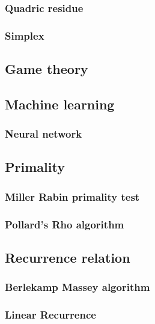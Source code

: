 \documentclass[titlepage,a4paper,10pt]{article}
\begin{document}
\begin{multicols}{2}
\begin{spacing}{0.8}
{				\subsubsection{Quadric residue}
					
				\subsubsection{Simplex}
					
			\subsection{Game theory}
				
			\subsection{Machine learning}
				\subsubsection{Neural network}
					
			\subsection{Primality}
				\subsubsection{Miller Rabin primality test}
					
				\subsubsection{Pollard's Rho algorithm}
					
			\subsection{Recurrence relation}
				\subsubsection{Berlekamp Massey algorithm}
					
				\subsubsection{Linear Recurrence}
					
}
\end{spacing}
\end{multicols}
\end{document}
